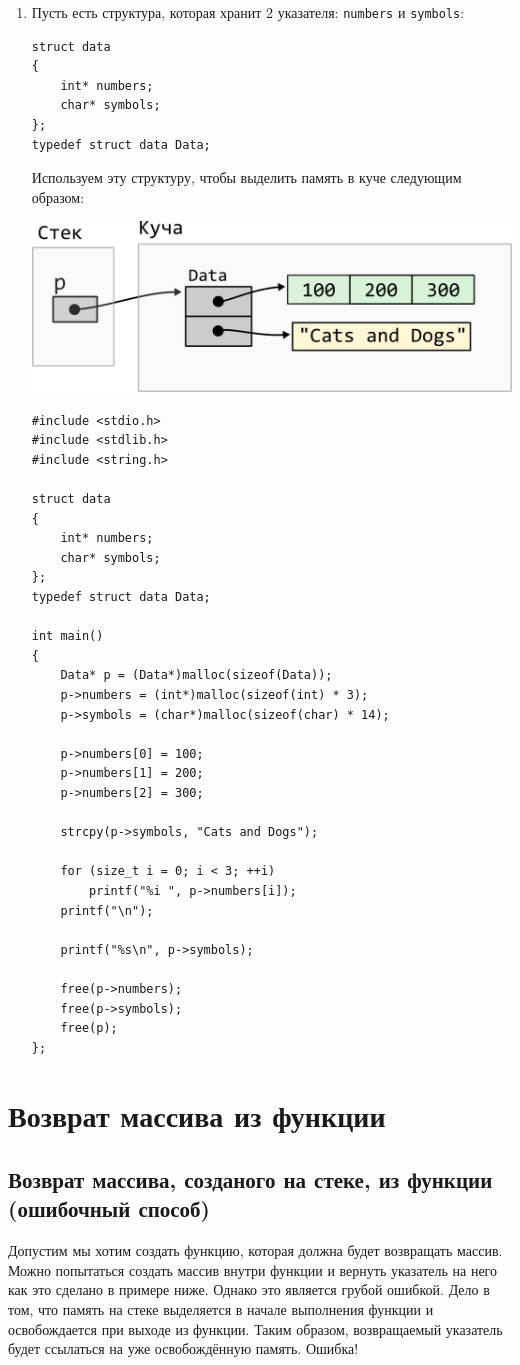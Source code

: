 \documentclass[10pt]{article}
\begin{document}
\begin{enumerate}
\item Пусть есть структура, которая хранит 2 указателя: \texttt{numbers} и \texttt{symbols}:
\begin{lstlisting}
struct data 
{
    int* numbers;
    char* symbols;
};
typedef struct data Data;
\end{lstlisting}

Используем эту структуру, чтобы выделить память в куче следующим образом:
\begin{center}
\includegraphics[scale=0.83]{../images/malloc_class_tasks/heap_struct_with_pointers.png}
\end{center}
\begin{lstlisting}[style=boxStyle]
#include <stdio.h>
#include <stdlib.h>
#include <string.h>

struct data
{
    int* numbers;
    char* symbols;
};
typedef struct data Data;

int main()
{
    Data* p = (Data*)malloc(sizeof(Data));
    p->numbers = (int*)malloc(sizeof(int) * 3);
    p->symbols = (char*)malloc(sizeof(char) * 14);

    p->numbers[0] = 100;
    p->numbers[1] = 200;
    p->numbers[2] = 300;

    strcpy(p->symbols, "Cats and Dogs");

    for (size_t i = 0; i < 3; ++i)
        printf("%i ", p->numbers[i]);
    printf("\n");

    printf("%s\n", p->symbols);

    free(p->numbers);
    free(p->symbols);
    free(p);
};
\end{lstlisting}

\end{enumerate}



\newpage
\section*{Возврат массива из функции}
\subsection*{Возврат массива, созданого на стеке, из функции (ошибочный способ)}
Допустим мы хотим создать функцию, которая должна будет возвращать массив.
Можно попытаться создать массив внутри функции и вернуть указатель на него как
это сделано в примере ниже.
Однако это является грубой ошибкой. Дело в том, что память на стеке
выделяется в начале выполнения функции и освобождается при выходе из функции.
Таким образом, возвращаемый указатель будет ссылаться на уже освобождённую память. Ошибка!\\
\end{document}
